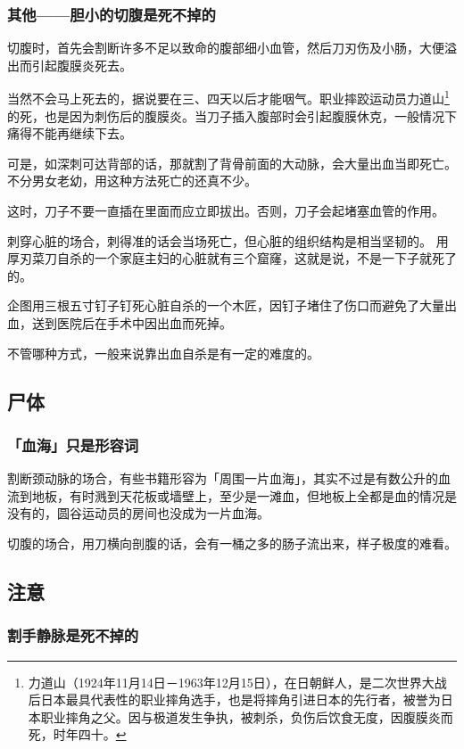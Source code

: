 \documentclass[UTF8]{ctexart}
\begin{document}
\subsubsection*{其他——胆小的切腹是死不掉的}

切腹时，首先会割断许多不足以致命的腹部细小血管，然后刀刃伤及小肠，大便溢出而引起腹膜炎死去。

当然不会马上死去的，据说要在三、四天以后才能咽气。职业摔跤运动员力道山\footnote{力道山（1924年11月14日－1963年12月15日），在日朝鲜人，是二次世界大战后日本最具代表性的职业摔角选手，也是将摔角引进日本的先行者，被誉为日本职业摔角之父。因与极道发生争执，被刺杀，负伤后饮食无度，因腹膜炎而死，时年四十。}的死，也是因为刺伤后的腹膜炎。当刀子插入腹部时会引起腹膜休克，一般情况下痛得不能再继续下去。

可是，如深刺可达背部的话，那就割了背骨前面的大动脉，会大量出血当即死亡。
不分男女老幼，用这种方法死亡的还真不少。

这时，刀子不要一直插在里面而应立即拔出。否则，刀子会起堵塞血管的作用。 

刺穿心脏的场合，刺得准的话会当场死亡，但心脏的组织结构是相当坚韧的。
用厚刃菜刀自杀的一个家庭主妇的心脏就有三个窟窿，这就是说，不是一下子就死了的。

企图用三根五寸钉子钉死心脏自杀的一个木匠，因钉子堵住了伤口而避免了大量出血，送到医院后在手术中因出血而死掉。

不管哪种方式，一般来说靠出血自杀是有一定的难度的。

\subsection{尸体}

\subsubsection*{「血海」只是形容词}

割断颈动脉的场合，有些书籍形容为「周围一片血海」，其实不过是有数公升的血流到地板，有时溅到天花板或墙壁上，至少是一滩血，但地板上全都是血的情况是没有的，圆谷运动员的房间也没成为一片血海。

切腹的场合，用刀横向剖腹的话，会有一桶之多的肠子流出来，样子极度的难看。

\subsection{注意}

\subsubsection*{割手静脉是死不掉的}
\end{document}
